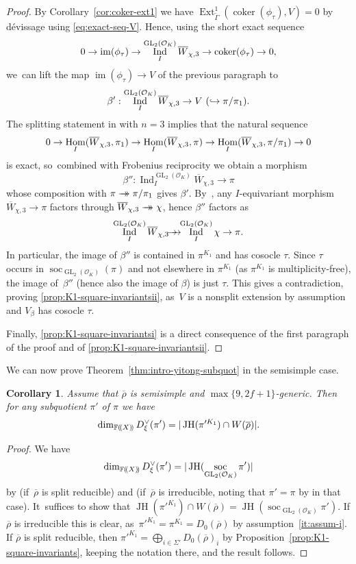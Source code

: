 \documentclass[JEP,XML,SOM,Unicode,NoFloatCountersInSection, NoEqCountersInSection,published]{cedram}
\newcommand\hto{\mathrel{\lhook\joinrel\to}}
\newcommand{\onto}{\mathchoice{\to\hspace*{-5mm}\to}{\mathrel{\hbox{$\to\hspace*{-2.85mm}\to$}}}{\to\hspace*{-3mm}\to}{\to\hspace*{-3mm}\to}}
\let\wt\widetilde
\newcommand{\F}{\mathbb{F}}
\newcommand{\cO}{\mathcal{O}}
\newcommand{\rhobar}{\overline{\rho}}
\newcommand{\brho}{\overline{\rho}}
\newcommand{\ppar}[1]{(\mkern-3mu(#1)\mkern-3mu)}
\DeclareMathOperator{\coker}{coker}
\DeclareMathOperator{\Ext}{Ext}
\DeclareMathOperator{\GL}{GL}
\DeclareMathOperator{\Hom}{Hom}
\DeclareMathOperator{\im}{im}
\DeclareMathOperator{\Ind}{Ind}
\DeclareMathOperator{\JH}{\mathrm{JH}}
\DeclareMathOperator{\soc}{soc}
\theoremstyle{plain}
\newtheorem{cor1}[prop1]{Corollary}
\theoremstyle{definition}
\begin{document}
\begin{proof}
By Corollary~\ref{cor:coker-ext1} we have $\Ext^1_{\wt{\Gamma}}(\coker(\phi_{\tau}),V)=0$ by dévissage using \eqref{eq:exact-seq-V}. Hence, using the short exact sequence
\[
0\to \im(\phi_{\tau})\to \Ind_I^{\GL_2(\cO_K)}\overline{W}_{\chi,3}\to \coker(\phi_{\tau})\ra0,
\]
we~can lift the map $\im(\phi_{\tau})\to V$ of the previous paragraph to
\[
\beta':\Ind_I^{\GL_2(\cO_K)}\overline{W}_{\chi,3}\to V\ (\hto\pi/\pi_1).
\]
The splitting statement in \cite[Cor.\,3.2.5]{BHHMS4} with $n = 3$ implies that the natural sequence
\[
0\to \Hom_I(\overline{W}_{\chi,3},\pi_1)\to \Hom_I(\overline{W}_{\chi,3},\pi)\to \Hom_I(\overline{W}_{\chi,3},\pi/\pi_1)\ra0
\]
is exact, so~combined with Frobenius reciprocity we obtain a morphism
\[
\beta'':\Ind_I^{\GL_2(\cO_K)}\overline{W}_{\chi,3}\to \pi
\]
whose composition with $\pi \onto \pi/\pi_1$ gives $\beta'$. By~\cite[Prop.\,6.4.6]{BHHMS1}, any $I$\nobreakdash-equi\-variant morphism $\overline{W}_{\chi,3}\to \pi$ factors through $\overline{W}_{\chi,3}\onto \chi$, hence $\beta''$ factors as
\[
\Ind_{I}^{\GL_2(\cO_K)}\overline{W}_{\chi,3}\onto \Ind_I^{\GL_2(\cO_K)}\chi\to \pi.
\]
In particular, the image of $\beta''$ is contained in $\pi^{K_1}$ and has cosocle $\tau$. Since $\tau$ occurs in $\soc_{\GL_2(\cO_K)}(\pi)$ and not elsewhere in $\pi^{K_1}$ (as $\pi^{K_1}$ is multiplicity-free), the image of~$\beta''$ (hence also the image of $\beta$) is just $\tau$. This gives a contradiction, proving \eqref{prop:K1-square-invariantsii}, as~$V$ is a nonsplit extension by assumption and $V_\beta$ has cosocle $\tau$.

Finally, \eqref{prop:K1-square-invariantsi} is a direct consequence of the first paragraph of the proof and of \eqref{prop:K1-square-invariantsii}.
\end{proof}

We can now prove Theorem~\ref{thm:intro-yitong-subquot} in the semisimple case.

\begin{cor1}\label{cor:yitong-subquot-ss}
Assume that $\brho$ is semisimple and $\max\{9,2f+1\}$-generic.
Then for any subquotient $\pi'$ of $\pi$ we have
\begin{equation*}
\dim_{\F\ppar{X}} D_{\xi}^{\vee}(\pi')=|\JH(\pi'^{K_1}) \cap W(\rhobar)|.
\end{equation*}
\end{cor1}

\begin{proof}
We have
\[
\dim_{\F\ppar{X}} D_{\xi}^{\vee}(\pi')=|\JH(\soc_{\GL_2(\cO_K)} \pi')|
\]
by \cite[Cor.\,3.2.7(i)]{BHHMS4} (if~$\brho$ is split reducible) and \cite[Prop.\,3.87(ii)]{BHHMS2} (if~$\brho$ is irreducible, noting that $\pi' = \pi$ by \cite[Cor.\,3.90]{BHHMS2} in that case). It~suffices to show that $\JH(\pi'^{K_1}) \cap W(\brho) = \JH(\soc_{\GL_2(\cO_K)} \pi')$.
If $\brho$ is irreducible this is clear, as~$\pi'^{K_1} = \pi^{K_1} = D_0(\brho)$ by assumption~\eqref{it:assum-i}.
If $\brho$ is split reducible, then $\pi'^{K_1} = \bigoplus_{i\in\Sigma'}{D}_0(\brho)_i$ by Proposition~\ref{prop:K1-square-invariants}, keeping the notation there, and the result follows.
\end{proof}
\end{document}
